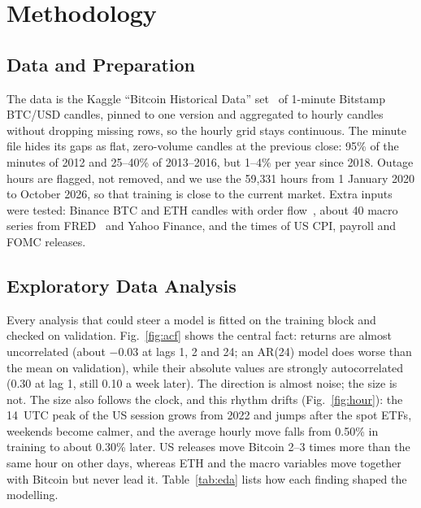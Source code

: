 \section{Methodology}
\label{sec:method}

\subsection{Data and Preparation}
\label{sec:data}
The data is the Kaggle ``Bitcoin Historical Data'' set~\cite{kaggle} of
1-minute Bitstamp BTC/USD candles, pinned to one version and aggregated
to hourly candles without dropping missing rows, so the hourly grid stays
continuous. The minute file hides its gaps as flat, zero-volume candles
at the previous close: 95\% of the minutes of 2012 and 25--40\% of
2013--2016, but 1--4\% per year since 2018. Outage hours are flagged, not
removed, and we use the 59{,}331 hours from 1 January 2020 to October
2026, so that training is close to the current market. Extra inputs were
tested: Binance BTC and ETH candles with order flow~\cite{binance}, about
40 macro series from FRED~\cite{fred} and Yahoo Finance, and the times of
US CPI, payroll and FOMC releases.

\subsection{Exploratory Data Analysis}
\label{sec:eda}
Every analysis that could steer a model is fitted on the training block
and checked on validation. Fig.~\ref{fig:acf} shows the central fact:
returns are almost uncorrelated (about $-0.03$ at lags 1, 2 and 24; an
AR(24) model does worse than the mean on validation), while their
absolute values are strongly autocorrelated (0.30 at lag 1, still 0.10 a
week later). The direction is almost noise; the size is not. The size
also follows the clock, and this rhythm drifts (Fig.~\ref{fig:hour}): the
14~UTC peak of the US session grows from 2022 and jumps after the spot
ETFs, weekends become calmer, and the average hourly move falls from
0.50\% in training to about 0.30\% later. US releases move Bitcoin 2--3
times more than the same hour on other days, whereas ETH and the macro
variables move together with Bitcoin but never lead it.
Table~\ref{tab:eda} lists how each finding shaped the modelling.

